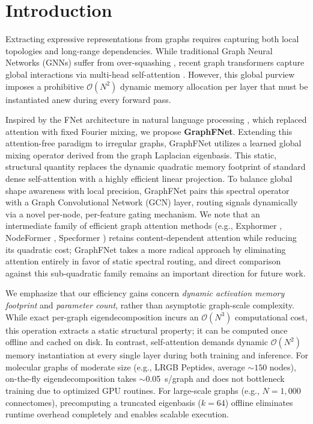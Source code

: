 \documentclass[10pt]{article}
\begin{document}
\begin{abstract}
\vspace{0.5em}
\noindent \textbf{Code Available At}: \url{https://anonymous.4open.science/r/GraphFNet-Attention-Free-Graph-Learning-via-Learned-Spectral-Local-Gating-9F2D/}
\end{abstract}

\section{Introduction}
Extracting expressive representations from graphs requires capturing both local topologies and long-range dependencies. While traditional Graph Neural Networks (GNNs) suffer from over-squashing \citep{alon2021bottleneck}, recent graph transformers capture global interactions via multi-head self-attention \citep{rampasek2022recipe, kreuzer2021rethinking}. However, this global purview imposes a prohibitive $\mathcal{O}(N^2)$ dynamic memory allocation per layer that must be instantiated anew during every forward pass.

Inspired by the FNet architecture in natural language processing \citep{lee-thorp2022fnet}, which replaced attention with fixed Fourier mixing, we propose \textbf{GraphFNet}. Extending this attention-free paradigm to irregular graphs, GraphFNet utilizes a learned global mixing operator derived from the graph Laplacian eigenbasis. This static, structural quantity replaces the dynamic quadratic memory footprint of standard dense self-attention with a highly efficient linear projection. To balance global shape awareness with local precision, GraphFNet pairs this spectral operator with a Graph Convolutional Network (GCN) layer, routing signals dynamically via a novel per-node, per-feature gating mechanism. We note that an intermediate family of efficient graph attention methods (e.g., Exphormer \citep{shirzad2023exphormer}, NodeFormer \citep{wu2022nodeformer}, Specformer \citep{bo2023specformer}) retains content-dependent attention while reducing its quadratic cost; GraphFNet takes a more radical approach by eliminating attention entirely in favor of static spectral routing, and direct comparison against this sub-quadratic family remains an important direction for future work.

We emphasize that our efficiency gains concern \textit{dynamic activation memory footprint} and \textit{parameter count}, rather than asymptotic graph-scale complexity. While exact per-graph eigendecomposition incurs an $\mathcal{O}(N^3)$ computational cost, this operation extracts a static structural property; it can be computed once offline and cached on disk. In contrast, self-attention demands dynamic $\mathcal{O}(N^2)$ memory instantiation at every single layer during both training and inference. For molecular graphs of moderate size (e.g., LRGB Peptides, average ${\sim}150$ nodes), on-the-fly eigendecomposition takes $\sim$0.05~s/graph and does not bottleneck training due to optimized GPU routines. For large-scale graphs (e.g., $N=1,000$ connectomes), precomputing a truncated eigenbasis ($k=64$) offline eliminates runtime overhead completely and enables scalable execution.
\end{document}
